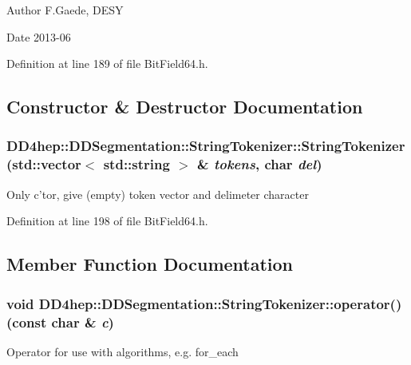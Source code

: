 \begin{DoxyAuthor}{Author}
F.Gaede, DESY 
\end{DoxyAuthor}
\begin{DoxyDate}{Date}
2013-\/06 
\end{DoxyDate}


Definition at line 189 of file BitField64.h.

\subsection{Constructor \& Destructor Documentation}
\hypertarget{class_d_d4hep_1_1_d_d_segmentation_1_1_string_tokenizer_aae9366c4f1ddf75a606c77af83970f8c}{
\subsubsection[{StringTokenizer}]{\setlength{\rightskip}{0pt plus 5cm}DD4hep::DDSegmentation::StringTokenizer::StringTokenizer (std::vector$<$ std::string $>$ \& {\em tokens}, \/  char {\em del})}}
\label{class_d_d4hep_1_1_d_d_segmentation_1_1_string_tokenizer_aae9366c4f1ddf75a606c77af83970f8c}
Only c'tor, give (empty) token vector and delimeter character 

Definition at line 198 of file BitField64.h.

\subsection{Member Function Documentation}
\hypertarget{class_d_d4hep_1_1_d_d_segmentation_1_1_string_tokenizer_a9a7f740ffc721446c786bd7aed987a4b}{
\subsubsection[{operator()}]{\setlength{\rightskip}{0pt plus 5cm}void DD4hep::DDSegmentation::StringTokenizer::operator() (const char \& {\em c})}}
\label{class_d_d4hep_1_1_d_d_segmentation_1_1_string_tokenizer_a9a7f740ffc721446c786bd7aed987a4b}
Operator for use with algorithms, e.g. for\_\-each 

